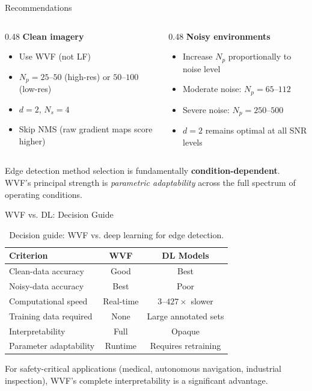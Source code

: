 \documentclass[10pt, aspectratio=169]{beamer}
\begin{document}
\begin{frame}{Recommendations}
  \begin{columns}[T]
    \begin{column}{0.48\textwidth}
      \textbf{Clean imagery}
      \begin{itemize}
        \item Use WVF (not LF)
        \item $N_p = 25$--$50$ (high-res) or $50$--$100$ (low-res)
        \item $d = 2$, $N_s = 4$
        \item Skip NMS (raw gradient maps score higher)
      \end{itemize}
    \end{column}
    \begin{column}{0.48\textwidth}
      \textbf{Noisy environments}
      \begin{itemize}
        \item Increase $N_p$ proportionally to noise level
        \item Moderate noise: $N_p = 65$--$112$
        \item Severe noise: $N_p = 250$--$500$
        \item $d = 2$ remains optimal at all SNR levels
      \end{itemize}
    \end{column}
  \end{columns}

  \vspace{1em}
  Edge detection method selection is fundamentally \textbf{condition-dependent}. WVF's principal strength is \textit{parametric adaptability} across the full spectrum of operating conditions.
\end{frame}

\begin{frame}{WVF vs. DL: Decision Guide}
  \begin{table}
    \centering
    \caption{Decision guide: WVF vs. deep learning for edge detection.}
    \begin{tabular}{lcc}
      \toprule
      \textbf{Criterion} & \textbf{WVF} & \textbf{DL Models} \\
      \midrule
      Clean-data accuracy      & Good       & Best \\
      Noisy-data accuracy      & Best       & Poor \\
      Computational speed      & Real-time  & $3$--$427\times$ slower \\
      Training data required   & None       & Large annotated sets \\
      Interpretability         & Full       & Opaque \\
      Parameter adaptability   & Runtime    & Requires retraining \\
      \bottomrule
    \end{tabular}
  \end{table}

  \vspace{0.3em}
  For safety-critical applications (medical, autonomous navigation, industrial inspection), WVF's complete interpretability is a significant advantage.
\end{frame}
\end{document}
